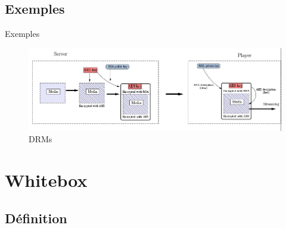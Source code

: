 \documentclass{beamer}
\begin{document}
\begin{frame}

\end{frame}

\subsection{Exemples}

\begin{frame}{Exemples}

 \begin{figure}[h]
    \centering
    \includegraphics[scale=0.50]{./images/drms.png}
    \caption{DRMs}
    \label{fig:keygen}
  \end{figure}

\end{frame}

\section{Whitebox}

\subsection{Définition}
\end{document}
